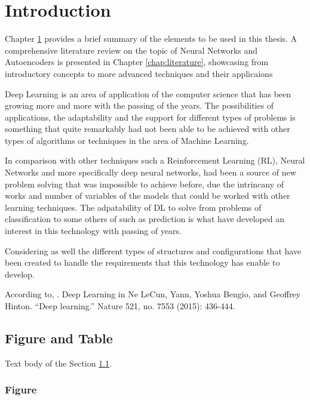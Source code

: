 \chapter{Introduction} \label{chap:introduction}

 Chapter \ref{chap:introduction} provides a brief summary of the elements to be used in this thesis. A comprehensive literature review on the topic of Neural Networks and Autoencoders is presented in Chapter \ref{chap:literature},
 showcasing from introductory concepts to more advanced techniques and their applicaions  

 Deep Learning is an area of application of the computer science that has been growing more and more with the passing of the years.
 The possibilities of applications, the adaptability and the support for different types of problems is something that quite remarkably 
 had not been able to be achieved with other types of algorithms or techniques in the area of Machine Learning.
 
 In comparison with other techniques such a Reinforcement Learning (RL), Neural Networks and more specifically deep neural networks,
 had been a source of new problem solving that was impossible to achieve before, due the intrincany of works and number of variables 
 of the models that could be worked with other learning techniques. The adpatability of DL to solve from problems of classification to some others of such as prediction is what have developed an interest
 in this technology with passing of years. 
 
 Considering as well the different types of structures and configurations that have been created to handle the requirements that this technology has enable to develop.
 
According to, \citet{Schmidhuber:2014}. Deep Learning in Ne
LeCun, Yann, Yoshua Bengio, and Geoffrey Hinton. “Deep learning.” Nature 521, no. 7553 (2015): 436-444.
 
 \section{Figure and Table}  \label{sec:FigureAndTable}

 Text body of the Section \ref{sec:FigureAndTable}.
 
 \subsection{Figure}  \label{subSec:Figure}

